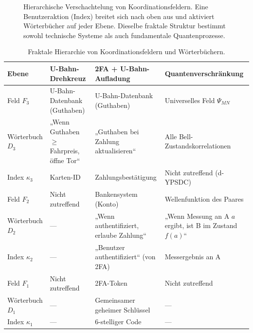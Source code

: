 \documentclass[12pt,a4paper]{article}
\theoremstyle{remark}
\begin{document}
	\begin{figure}[htbp]
		\centering
		\caption{Hierarchische Verschachtelung von Koordinationsfeldern. Eine Benutzeraktion (Index) breitet sich nach oben aus und aktiviert Wörterbücher auf jeder Ebene. Dieselbe fraktale Struktur bestimmt sowohl technische Systeme als auch fundamentale Quantenprozesse.}
		\label{fig:hierarchy}
	\end{figure}
	
	\begin{table}[htbp]
		\centering
		\caption{Fraktale Hierarchie von Koordinationsfeldern und Wörterbüchern.}
		\label{tab:fractal-examples}
		\small
		\begin{tabular}{p{2.5cm} p{3.5cm} p{3.5cm} p{3.5cm}}
			\toprule
			\textbf{Ebene} & \textbf{U-Bahn-Drehkreuz} & \textbf{2FA + U-Bahn-Aufladung} & \textbf{Quantenverschränkung} \\
			\midrule
			Feld $F_3$ & U-Bahn-Datenbank (Guthaben) & U-Bahn-Datenbank (Guthaben) & Universelles Feld $\Psi_{MN}$ \\
			Wörterbuch $D_3$ & „Wenn Guthaben $\ge$ Fahrpreis, öffne Tor“ & „Guthaben bei Zahlung aktualisieren“ & Alle Bell-Zustandskorrelationen \\
			Index $\kappa_3$ & Karten-ID & Zahlungsbestätigung & Nicht zutreffend (d-YPSDC) \\
			\midrule
			Feld $F_2$ & Nicht zutreffend & Bankensystem (Konto) & Wellenfunktion des Paares \\
			Wörterbuch $D_2$ & --- & „Wenn authentifiziert, erlaube Zahlung“ & „Wenn Messung an A $a$ ergibt, ist B im Zustand $f(a)$“ \\
			Index $\kappa_2$ & --- & „Benutzer authentifiziert“ (von 2FA) & Messergebnis an A \\
			\midrule
			Feld $F_1$ & Nicht zutreffend & 2FA-Token & Nicht zutreffend \\
			Wörterbuch $D_1$ & --- & Gemeinsamer geheimer Schlüssel & --- \\
			Index $\kappa_1$ & --- & 6-stelliger Code & --- \\
			\bottomrule
		\end{tabular}
	\end{table}
	
\end{document}
